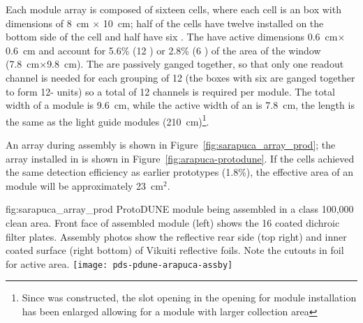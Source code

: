 Each   module array is composed of sixteen cells, where each cell is an  box with dimensions of \SI{8}{cm} $\times$ \SI{10}{cm}; half of the cells have twelve  installed on the bottom side of the cell and  half have six . The  have active dimensions \SI{0.6}{cm}$\times$\SI{0.6}{cm} and account for 5.6\% (\num{12} ) or \num{2.8}\% (\num{6} ) of the area of the window (\SI{7.8}{cm}$\times$\SI{9.8}{cm}).
The   are passively ganged together, so that only one readout channel is needed for each  grouping of \num{12}  (the boxes with six  are ganged together to form \num{12}- units) so a total of \num{12} channels is required per module. 
The total width of a module is \SI{9.6}{cm}, while the active width of an  is \SI{7.8}{cm}, the length is the same as the light guide modules (\SI{210}{cm})\footnote{Since  was constructed, the slot opening in the  opening for  module installation has been enlarged allowing for a module with larger collection area}.

An  array during assembly is shown in Figure~\ref{fig:sarapuca_array_prod}; the array installed in  is shown in Figure~\ref{fig:arapuca-protodune}. If the  cells achieved the same detection efficiency as earlier prototypes (1.8\%), the effective area of an  module will be approximately \SI{23}{cm$^2$}.

\begin{dunefigure}{fig:sarapuca_array_prod}
{ProtoDUNE  module being assembled in a class 100,000 clean area.  Front face of assembled module (left) shows the 16 coated dichroic filter plates.  Assembly photos show the reflective rear side (top right) and inner coated surface (right bottom) of Vikuiti reflective foils.  Note the cutouts in foil for  active area.}
	\texttt{[image: pds-pdune-arapuca-assby]}
\end{dunefigure}

